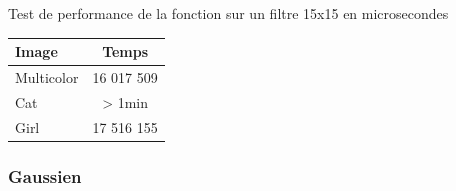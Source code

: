 \documentclass{article}
\begin{document}
\begin{center}
\medbreak
Test de performance de la fonction sur un filtre 15x15 en microsecondes
\bigbreak
   \begin{tabular}{ | l | c | }
     \hline
     Image & Temps \\
     \hline
     Multicolor & 16 017 509 \\
     \hline
     Cat & > 1min \\
     \hline
     Girl & 17 516 155 \\
     \hline
   \end{tabular}
 \end{center}
\bigbreak

\subsubsection{Gaussien}
\end{document}
